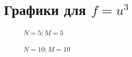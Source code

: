 \documentclass[12pt]{extarticle}
\numberwithin{equation}{section}
\begin{document}
\section{Графики для $f=u^3$} \label{grap3}
\begin{figure}[H]
\begin{minipage}[h]{0.43\linewidth}
 $N=5; M=5$ \\
\end{minipage}
\hfill
\begin{minipage}[h]{0.43\linewidth}
 $N=10; M=10$ \\
\end{minipage}
\end{figure}
\end{document}
